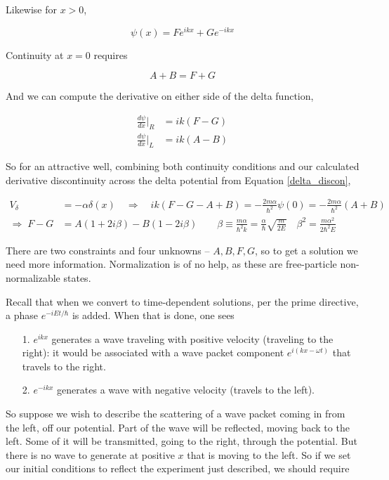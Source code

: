 Likewise for $x>0$, 

\[
  \psi(x) = Fe^{ikx} + Ge^{-ikx} 
\] \vspace{3px}

Continuity at $x =0$ requires 

\[
A+B = F+G
\] \vspace{3px}

And we can compute the derivative on either side of the delta function, 

\begin{align} \label{}
  \frac{d \psi}{d x} \Big|_R &= ik(F-G) \\ \frac{d \psi}{d x} \Big|_L &=
  ik(A-B)
\end{align}\vspace{3px}

So for an attractive well, combining both continuity conditions and our
calculated derivative discontinuity across the delta potential from Equation
\ref{delta_discon}, 

\begin{align} \label{}
  V_\delta &= -\alpha \delta(x) \quad \Rightarrow \quad ik(F-G-A+B)
  = -\frac{2m\alpha}{\hbar^2}\psi(0) = -\frac{2m\alpha}{\hbar^2}(A+B) \\ 
  \Rightarrow \; F - G &= A(1+2i\beta) - B(1-2i\beta) \qquad \beta \equiv
  \frac{m\alpha}{\hbar^2 k} = \frac{\alpha}{\hbar}\sqrt{\frac{m}{2E}} \quad
  \beta^2 = \frac{m\alpha^2}{2\hbar^2 E}
\end{align}\vspace{3px}

There are two constraints and four unknowns -- $A, B, F, G$, so to get
a solution we need more information. Normalization is of no help, as these are
free-particle non-normalizable states.

Recall that when we convert to time-dependent solutions, per the prime
directive, a phase  $e^{-iEt / \hbar}$ is added. When that is done, one sees 

\begin{itemize}
  \item[1.] $e^{ikx}$ generates a wave traveling with positive velocity
    (traveling to the right): it would be associated with a wave packet
    component $e^{i(kx - \omega t)}$ that travels to the right. 
  \item[2.] $e^{-ikx}$ generates a wave with negative velocity (travels to the
    left). 
\end{itemize}

So suppose we wish to describe the scattering of a wave packet coming in from
the left, off our potential. Part of the wave will be reflected, moving back to
the left. Some of it will be transmitted, going to the right, through the
potential. But there is no wave to generate at positive $x$ that is moving to
the left. So if we set our initial conditions to reflect the experiment just
described, we should require 

